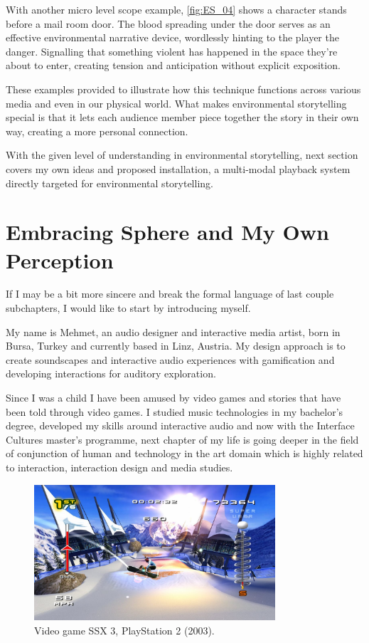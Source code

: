     With another micro level scope example, \ref{fig:ES_04} shows a character stands before a mail room door. The blood spreading under the door serves as an effective environmental narrative device, wordlessly hinting to the player the danger. Signalling that something violent has happened in the space they're about to enter, creating tension and anticipation without explicit exposition.\par    

    These examples provided to illustrate how this technique functions across various media and even in our physical world. What makes environmental storytelling special is that it lets each audience member piece together the story in their own way, creating a more personal connection.\par

    With the given level of understanding in environmental storytelling, next section covers my own ideas and proposed installation, a multi-modal playback system directly targeted for environmental storytelling.\par
    \section{Embracing Sphere and My Own Perception} 
    If I may be a bit more sincere and break the formal language of last couple subchapters, I would like to start by introducing myself.\par 
    
    My name is Mehmet, an audio designer and interactive media artist, born in Bursa, Turkey and currently based in Linz, Austria. My design approach is to create soundscapes and interactive audio experiences with gamification and developing interactions for auditory exploration.\par

    Since I was a child I have been amused by video games and stories that have been told through video games. I studied music technologies in my bachelor's degree, developed my skills around interactive audio and now with the Interface Cultures master's programme, next chapter of my life is going deeper in the field of conjunction of human and technology in the art domain which is highly related to interaction, interaction design and media studies.

    \begin{figure}[H]
    \centering
    \includegraphics[width=0.8\textwidth]{images/ssx3}
    \caption{Video game SSX 3, PlayStation 2 (2003).}
    \label{fig:SSX3}
    \end{figure}

